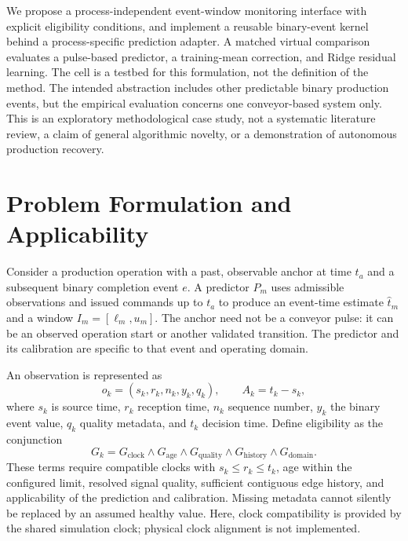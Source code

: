 We propose a process-independent event-window monitoring interface with explicit eligibility conditions, and implement a reusable binary-event kernel behind a process-specific prediction adapter. A matched virtual comparison evaluates a pulse-based predictor, a training-mean correction, and Ridge residual learning. The cell is a testbed for this formulation, not the definition of the method. The intended abstraction includes other predictable binary production events, but the empirical evaluation concerns one conveyor-based system only. This is an exploratory methodological case study, not a systematic literature review, a claim of general algorithmic novelty, or a demonstration of autonomous production recovery.

\section{Problem Formulation and Applicability}
Consider a production operation with a past, observable anchor at time $t_a$ and a subsequent binary completion event $e$. A predictor $P_m$ uses admissible observations and issued commands up to $t_a$ to produce an event-time estimate $\widehat t_m$ and a window $I_m=[\ell_m,u_m]$. The anchor need not be a conveyor pulse: it can be an observed operation start or another validated transition. The predictor and its calibration are specific to that event and operating domain.

An observation is represented as
\begin{equation}
 o_k=(s_k,r_k,n_k,y_k,q_k),\qquad A_k=t_k-s_k,
\end{equation}
where $s_k$ is source time, $r_k$ reception time, $n_k$ sequence number, $y_k$ the binary event value, $q_k$ quality metadata, and $t_k$ decision time. Define eligibility as the conjunction
\begin{equation}
 G_k=G_{\mathrm{clock}}\land G_{\mathrm{age}}\land G_{\mathrm{quality}}
 \land G_{\mathrm{history}}\land G_{\mathrm{domain}}.
\end{equation}
These terms require compatible clocks with $s_k\leq r_k\leq t_k$, age within the configured limit, resolved signal quality, sufficient contiguous edge history, and applicability of the prediction and calibration. Missing metadata cannot silently be replaced by an assumed healthy value. Here, clock compatibility is provided by the shared simulation clock; physical clock alignment is not implemented.

